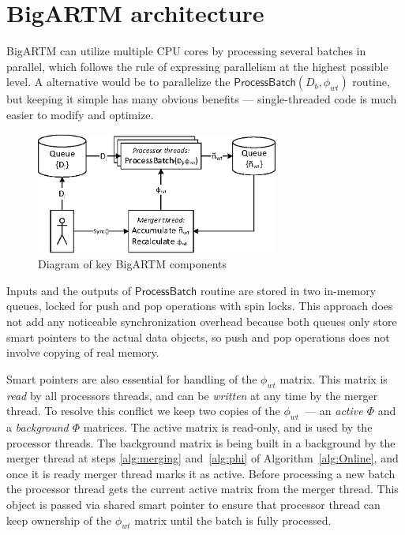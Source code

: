\documentclass{llncs}
\newcommand{\kw}[1]{\textsf{#1}}
\begin{document}
\section{BigARTM architecture}
\label{sec:BigARTM}

BigARTM can utilize multiple CPU cores by processing several batches in parallel,
which follows the rule of expressing parallelism at the highest possible level.
A alternative would be to parallelize the $\kw{ProcessBatch}(D_b, \phi_{wt})$ routine,
but keeping it simple has many obvious benefits --- single-threaded code is much easier to modify and optimize.

\begin{figure}[h!]
\begin{centering}
\includegraphics[height=40mm]{diagramm_artm_core.eps}
\caption{Diagram of key BigARTM components}
\label{fig:diagramm_artm_core}
\end{centering}
\end{figure}

Inputs and the outputs of $\kw{ProcessBatch}$ routine are stored in two in-memory queues,
locked for push and pop operations with spin locks.
This approach does not add any noticeable synchronization overhead because
both queues only store smart pointers to the actual data objects,
so push and pop operations does not involve copying of real memory.

Smart pointers are also essential for handling of the $\phi_{wt}$ matrix.
This matrix is \emph{read} by all processors threads, and can be \emph{written} at any time by the merger thread.
To resolve this conflict we keep two copies of the $\phi_{wt}$~--- an \emph{active $\Phi$} and a \emph{background $\Phi$} matrices.
The active matrix is read-only, and is used by the processor threads.
The background matrix is being built in a background by the merger thread 
at steps \ref{alg:merging} and~\ref{alg:phi} of Algorithm~\ref{alg:Online},
and once it is ready merger thread marks it as active.
Before processing a new batch the processor thread gets the current active matrix from the merger thread.
This object is passed via shared smart pointer to ensure that processor thread can keep ownership of the $\phi_{wt}$ matrix
until the batch is fully processed.
\end{document}
